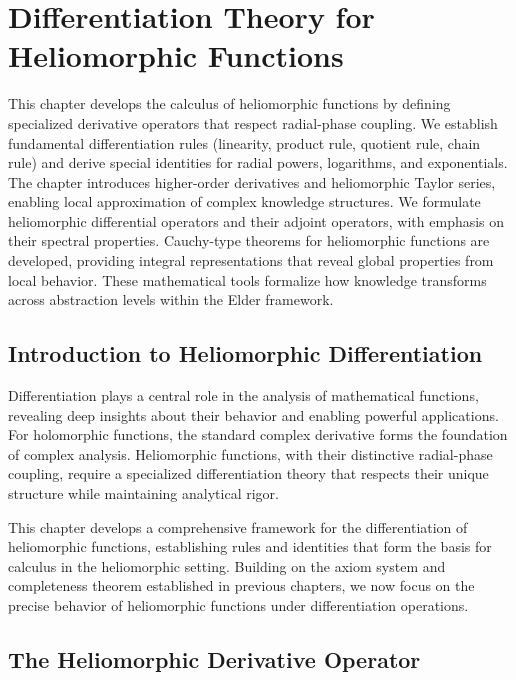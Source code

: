\chapter{Differentiation Theory for Heliomorphic Functions}

\begin{tcolorbox}[colback=PureBlue!5!white,colframe=PureBlue!75!black,title=Chapter Summary]
This chapter develops the calculus of heliomorphic functions by defining specialized derivative operators that respect radial-phase coupling. We establish fundamental differentiation rules (linearity, product rule, quotient rule, chain rule) and derive special identities for radial powers, logarithms, and exponentials. The chapter introduces higher-order derivatives and heliomorphic Taylor series, enabling local approximation of complex knowledge structures. We formulate heliomorphic differential operators and their adjoint operators, with emphasis on their spectral properties. Cauchy-type theorems for heliomorphic functions are developed, providing integral representations that reveal global properties from local behavior. These mathematical tools formalize how knowledge transforms across abstraction levels within the Elder framework.
\end{tcolorbox}

\section{Introduction to Heliomorphic Differentiation}

Differentiation plays a central role in the analysis of mathematical functions, revealing deep insights about their behavior and enabling powerful applications. For holomorphic functions, the standard complex derivative forms the foundation of complex analysis. Heliomorphic functions, with their distinctive radial-phase coupling, require a specialized differentiation theory that respects their unique structure while maintaining analytical rigor.

This chapter develops a comprehensive framework for the differentiation of heliomorphic functions, establishing rules and identities that form the basis for calculus in the heliomorphic setting. Building on the axiom system and completeness theorem established in previous chapters, we now focus on the precise behavior of heliomorphic functions under differentiation operations.

\section{The Heliomorphic Derivative Operator}

